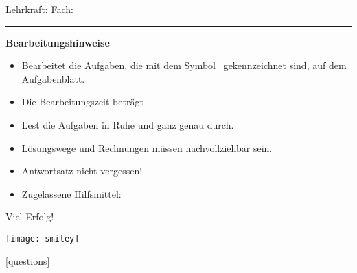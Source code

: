 \firstpageheadrule
{}
\coverheader
	{Lehrkraft: \lehrname\linebreak
		Fach: \ufach \linebreak
		\lstniveau}
	{\medskip\Large{\textbf{\LEKArt \ \KAnr}} \linebreak
		\normalsize{\kathema}}
	{{}}
\begin{coverpages}
\vspace*{-0.7cm}\hrule \vspace*{0.5cm}
\begin{large}
\textbf{Bearbeitungshinweise}
\end{large}
\begin{itemize}
\item Bearbeitet die Aufgaben, die mit dem Symbol \hier \ gekennzeichnet sind, auf dem Aufgabenblatt.
\item Die Bearbeitungszeit beträgt \bearbzeit .
\item Lest die Aufgaben in Ruhe und ganz genau durch.
\item Lösungswege und Rechnungen müssen nachvollziehbar sein.
\item Antwortsatz nicht vergessen!
\item Zugelassene Hilfsmittel: \textbf{\zglhilf}
\end{itemize}
\vspace*{0.3cm}
\begin{center}
\begin{huge}
Viel Erfolg!
\end{huge}
\linebreak\texttt{[image: smiley]}
\linebreak
\hdashrule[0.1ex]{18.5cm}{0.5mm}{3mm 3pt} 
\end{center}
\begin{center}
\cellwidth{2.2em}
\newcommand{\bwrtzeilen}{1}
\multirowgradetable{%
  \numrows
}[questions]


\end{center}
\end{coverpages}

